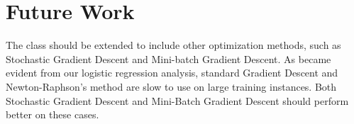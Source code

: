 \section{Future Work}\label{sec:Future}

The  class should be extended to include other optimization methods, such as Stochastic Gradient Descent and Mini-batch Gradient Descent. As became evident from our logistic regression analysis, standard Gradient Descent and Newton-Raphson's method are slow to use on large training instances. Both Stochastic Gradient Descent and Mini-Batch Gradient Descent should perform better on these cases.  